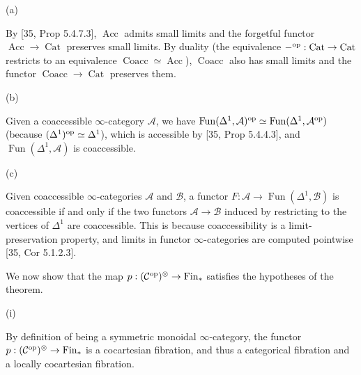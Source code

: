 \documentclass[10pt,a4paper]{article}
\begin{document}
\par\noindent  (a) 
 
By [35, Prop 5.4.7.3], $\operatorname{Acc}$ admits small limits and the forgetful functor $\operatorname{Acc}\to\operatorname{Cat}$ preserves small limits. By duality (the equivalence $-^{\textnormal{op}}:\operatorname{Cat}\to\operatorname{Cat}$ restricts to an equivalence $\operatorname{Coacc}\simeq\operatorname{Acc}$), $\operatorname{Coacc}$ also has small limits and the functor $\operatorname{Coacc}\to\operatorname{Cat}$ preserves them.\par
 
 
 
\par\noindent  (b) 
 
Given a coaccessible $\infty$-category ${\mathcal{A}}$, we have $\operatorname{Fun}(\Delta^{1},{\mathcal{A}})^{\textnormal{op}}\simeq\operatorname{Fun}(\Delta^{1},{\mathcal{A}}^{\textnormal{op}})$ (because $(\Delta^{1})^{\textnormal{op}}\simeq\Delta^{1}$), which is accessible by [35, Prop 5.4.4.3], and $\operatorname{Fun}(\Delta^{1},{\mathcal{A}})$ is coaccessible.\par
 
 
 
\par\noindent  (c) 
 
Given coaccessible $\infty$-categories ${\mathcal{A}}$ and ${\mathcal{B}}$, a functor $F:{\mathcal{A}}\to\operatorname{Fun}(\Delta^{1},{\mathcal{B}})$ is coaccessible if and only if the two functors ${\mathcal{A}}\to{\mathcal{B}}$ induced by restricting to the vertices of $\Delta^{1}$ are coaccessible. This is because coaccessibility is a limit-preservation property, and limits in functor $\infty$-categories are computed pointwise [35, Cor 5.1.2.3].\par
 
 
  
We now show that the map $p:({\mathcal{C}}^{\textnormal{op}})^{\otimes}\to\operatorname{Fin}_{\ast}$ satisfies the hypotheses of the theorem.\par
  
\par\noindent  (i) 
 
By definition of being a symmetric monoidal $\infty$-category, the functor $p:({\mathcal{C}}^{\textnormal{op}})^{\otimes}\to\operatorname{Fin}_{\ast}$ is a cocartesian fibration, and thus a categorical fibration and a locally cocartesian fibration.\par
 
\end{document}
